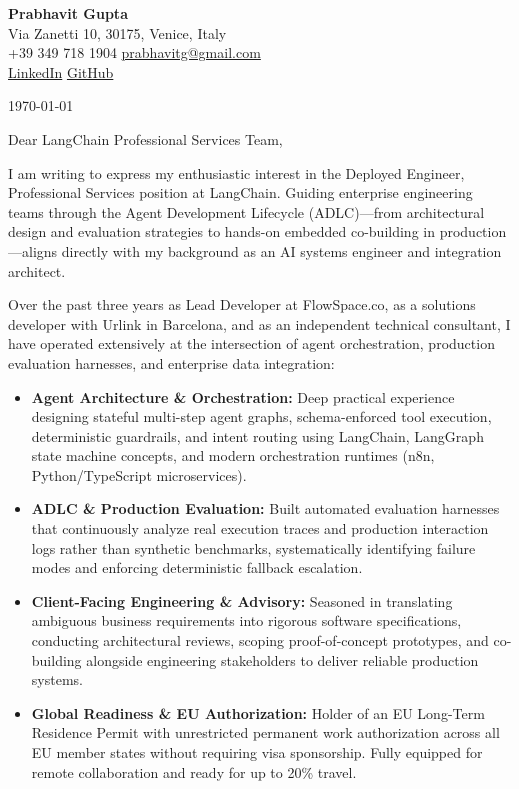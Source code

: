 \documentclass[11pt,a4paper]{article}
\begin{document}
\begin{center}
    {\huge \textbf{Prabhavit Gupta}} \\
    \vspace{4pt}
    Via Zanetti 10, 30175, Venice, Italy \\
    +39 349 718 1904 \textbar{} \href{mailto:prabhavitg@gmail.com}{prabhavitg@gmail.com} \\
    \href{https://www.linkedin.com/in/prabhavit/}{LinkedIn} \textbar{} \href{https://github.com/prab-gupta}{GitHub}
\end{center}

\vspace{10pt}

\noindent \today

\vspace{6pt}

\noindent Dear LangChain Professional Services Team,

\vspace{6pt}

\noindent I am writing to express my enthusiastic interest in the Deployed Engineer, Professional Services position at LangChain. Guiding enterprise engineering teams through the Agent Development Lifecycle (ADLC)---from architectural design and evaluation strategies to hands-on embedded co-building in production---aligns directly with my background as an AI systems engineer and integration architect.

\noindent Over the past three years as Lead Developer at FlowSpace.co, as a solutions developer with Urlink in Barcelona, and as an independent technical consultant, I have operated extensively at the intersection of agent orchestration, production evaluation harnesses, and enterprise data integration:

\begin{itemize}[leftmargin=*]
    \item \textbf{Agent Architecture \& Orchestration:} Deep practical experience designing stateful multi-step agent graphs, schema-enforced tool execution, deterministic guardrails, and intent routing using LangChain, LangGraph state machine concepts, and modern orchestration runtimes (n8n, Python/TypeScript microservices).
    \item \textbf{ADLC \& Production Evaluation:} Built automated evaluation harnesses that continuously analyze real execution traces and production interaction logs rather than synthetic benchmarks, systematically identifying failure modes and enforcing deterministic fallback escalation.
    \item \textbf{Client-Facing Engineering \& Advisory:} Seasoned in translating ambiguous business requirements into rigorous software specifications, conducting architectural reviews, scoping proof-of-concept prototypes, and co-building alongside engineering stakeholders to deliver reliable production systems.
    \item \textbf{Global Readiness \& EU Authorization:} Holder of an EU Long-Term Residence Permit with unrestricted permanent work authorization across all EU member states without requiring visa sponsorship. Fully equipped for remote collaboration and ready for up to 20\% travel.
\end{itemize}
\end{document}
